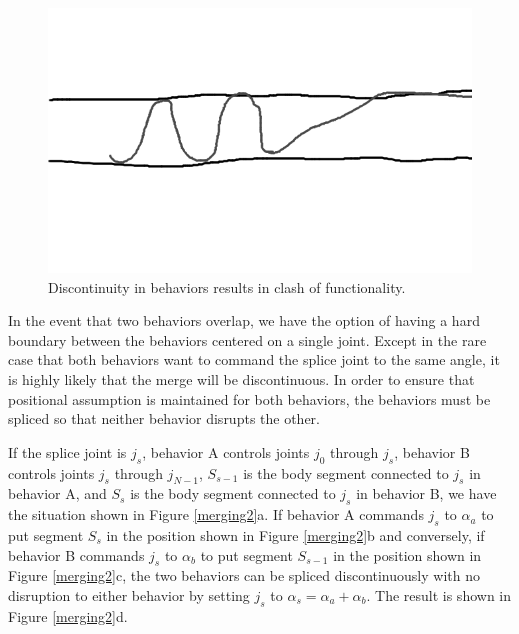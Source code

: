 \begin{figure}
\begin{center}
\includegraphics[scale=0.5]{2_merging_1.png}
\end{center}
\caption{Discontinuity in behaviors results in clash of functionality.}
\label{merging1}
\end{figure}

In the event that two behaviors overlap, we have the option of having a hard boundary between the behaviors centered on a single joint. Except in the rare case that both behaviors want to command the splice joint to the same angle, it is highly likely that the merge will be discontinuous.  In order to ensure that positional assumption is maintained for both behaviors, the behaviors must be spliced so that neither behavior disrupts the other.

If the splice joint is $j_s$, behavior A controls joints $j_0$ through $j_s$, behavior B controls joints $j_s$ through $j_{N-1}$, $S_{s-1}$ is the body segment connected to $j_s$ in behavior A, and $S_s$ is the body segment connected to $j_s$ in behavior B, we have the situation shown in Figure \ref{merging2}a.  If behavior A commands $j_s$ to $\alpha_a$ to put segment $S_s$ in the position shown in Figure \ref{merging2}b and conversely, if behavior B commands $j_s$ to $\alpha_b$ to put segment $S_{s-1}$ in the position shown in Figure \ref{merging2}c, the two behaviors can be spliced discontinuously with no disruption to either behavior by setting $j_s$ to $\alpha_s = \alpha_a + \alpha_b$.  The result is shown in Figure \ref{merging2}d.

